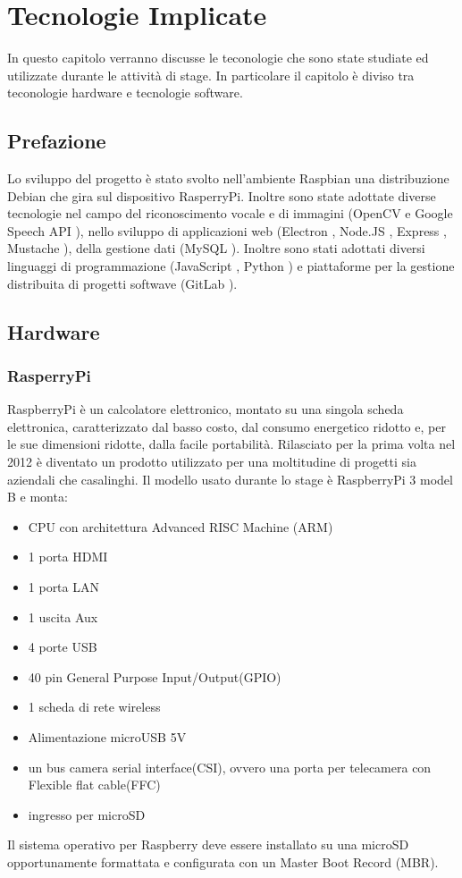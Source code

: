 \chapter{Tecnologie Implicate}\label{capitolo2}
In questo capitolo verranno discusse le teconologie che sono state studiate ed utilizzate durante le attivit\`a di stage.
In particolare il capitolo \`e diviso tra teconologie hardware e tecnologie software.

\section{Prefazione}
Lo sviluppo del progetto \`e stato svolto nell'ambiente Raspbian\cite{Raspbian}
una distribuzione Debian\cite{Debian} che gira sul dispositivo RasperryPi\cite{Raspberry}.
Inoltre sono state adottate diverse tecnologie nel campo del riconoscimento vocale e di
immagini (OpenCV \cite{OpenCV-website} e Google Speech API \cite{GoogleSTT-website}),
nello sviluppo di applicazioni web (Electron \cite{Electron-website}, Node.JS \cite{Node.JS-website},
Express \cite{Express-website}, Mustache \cite{Mustache}), della gestione dati (MySQL \cite{MySQL}).
Inoltre sono stati adottati diversi linguaggi di programmazione (JavaScript \cite{JavaScript}, Python \cite{Python})
e piattaforme per la gestione distribuita di progetti softwave (GitLab \cite{git-website}).

\section{Hardware}
\subsection{RasperryPi}
RaspberryPi \`e un calcolatore elettronico, montato su una singola scheda elettronica,
caratterizzato dal basso costo, dal consumo energetico ridotto e, per le sue
dimensioni ridotte, dalla facile portabilit\`a.
Rilasciato per la prima volta nel 2012 \`e diventato un prodotto utilizzato per una moltitudine
di progetti sia aziendali che casalinghi.
Il modello usato durante lo stage \`e RaspberryPi 3 model B e monta:
\begin{itemize}
\item CPU con architettura Advanced RISC Machine (ARM)
\item 1 porta HDMI
\item 1 porta LAN
\item 1 uscita Aux
\item 4 porte USB
\item 40 pin General Purpose Input/Output(GPIO)
\item 1 scheda di rete wireless
\item Alimentazione microUSB 5V
\item un bus camera serial interface(CSI), ovvero una porta per telecamera con Flexible flat cable(FFC)
\item ingresso per microSD
\end{itemize}
Il sistema operativo per Raspberry deve essere installato su una microSD opportunamente formattata
e configurata con un Master Boot Record (MBR).

